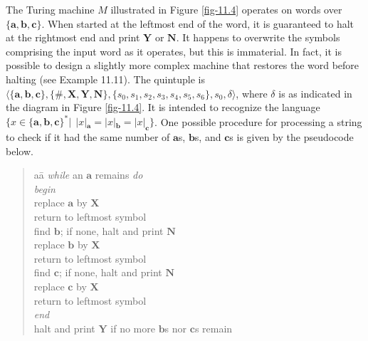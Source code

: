 The Turing machine $M$ illustrated in Figure \ref{fig-11.4} operates on words over
$\{\pmb{a},\pmb{b},\pmb{c}\}$. When started at the leftmost end of the word, it
is guaranteed to halt at the rightmost end and print $\pmb{Y}$ or $\pmb{N}$. It
happens to overwrite the symbols comprising the input word as it operates, but
this is immaterial. In fact, it is possible to design a slightly more complex
machine that restores the word before halting (see Example 11.11). The quintuple
is $\langle\{\pmb{a},\pmb{b},\pmb{c}\},\{\pmb{\#},\pmb{X},\pmb{Y},\pmb{N}\},\{
s_0,s_1,s_2,s_3,s_4,s_5,s_6\},s_0,\delta\rangle$, where $\delta$ is as indicated
in the diagram in Figure \ref{fig-11.4}. It is intended to recognize the language
$\{x\in\{\pmb{a},\pmb{b},\pmb{c}\}^*|\ \ |x|_{\pmb{a}}=|x|_{\pmb{b}}=|x|_{\pmb{c}}
\}$. One possible procedure for processing a string to check if it had the same
number of $\pmb{a}$s, $\pmb{b}$s, and $\pmb{c}$s is given by the pseudocode
below.

\begin{quote}\begin{tabbing}
aa\=\kill
\emph{while} an $\pmb{a}$ remains \emph{do} \\
\emph{begin} \\
\> replace $\pmb{a}$ by $\pmb{X}$ \\
\> return to leftmost symbol \\
\> find $\pmb{b}$; if none, halt and print $\pmb{N}$ \\
\> replace $\pmb{b}$ by $\pmb{X}$ \\
\> return to leftmost symbol \\
\> find $\pmb{c}$; if none, halt and print $\pmb{N}$ \\
\> replace $\pmb{c}$ by $\pmb{X}$ \\
\> return to leftmost symbol \\
\emph{end} \\
halt and print $\pmb{Y}$ if no more $\pmb{b}$s nor $\pmb{c}$s remain
\end{tabbing}\end{quote}

